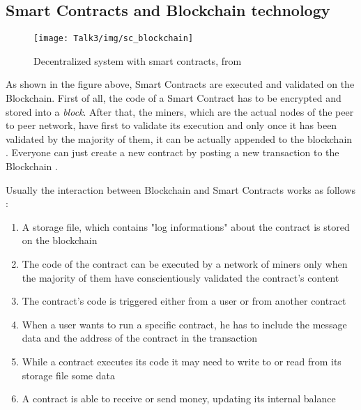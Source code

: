 

\subsection{Smart Contracts and Blockchain technology}
           \begin{figure}[H]
         \begin{center}
         \texttt{[image: Talk3/img/sc\_blockchain]}
         \end{center}
         \caption{Decentralized system with smart contracts, from \cite{paper3}}
         \label{label}
       \end{figure}

As shown in the figure above, Smart Contracts are executed and validated on the Blockchain. First of all, the code of a Smart Contract has to be encrypted \cite{yo} and stored into a \textit{block}. 
After that, the miners, which are the actual nodes of the peer to peer network, have first to validate its execution and only once it has been validated by the majority of them, it can be actually appended to the blockchain \cite{SC2}. 
Everyone can just create a new contract by posting a new transaction to the Blockchain \cite{paper3}.

Usually the interaction between Blockchain and Smart Contracts works as follows \cite{paper3}: 

\begin{enumerate}
\item A storage file, which contains "log informations" about the contract is stored on the blockchain 
\item The code of the contract can be executed by a network of miners only when the majority of them have conscientiously validated the contract's content
\item The contract's code is triggered either from a user or from another contract
\item When a user wants to run a specific contract, he has to include the message data and the address of the contract in the transaction   
\item While a contract executes its code it may need to write to or read from its storage file some data 
\item A contract is able to receive or send money, updating its internal balance
\end{enumerate}

